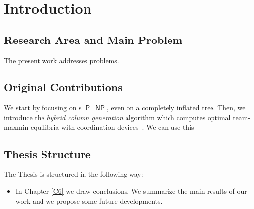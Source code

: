 \chapter{Introduction}

\section{Research Area and Main Problem}

The present work addresses problems.



\section{Original Contributions}
We start by focusing on s $\textsf{P} = \textsf{NP}$, even on a completely inflated tree.
Then, we introduce the \emph{hybrid column generation} algorithm which computes optimal team-maxmin equilibria with coordination devices~\citep{celli18}. We can use this 


\section{Thesis Structure}

The Thesis is structured in the following way:
\begin{itemize}
    \item In Chapter \ref{C6} we draw conclusions. We summarize the main results of our work and we propose some future developments.
\end{itemize}





